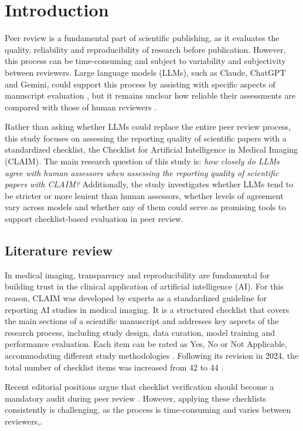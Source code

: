 \section{Introduction}
Peer review is a fundamental part of scientific publishing, as it evaluates the quality, reliability and reproducibility of research before publication. However, this process can be time-consuming and subject to variability and subjectivity between reviewers. Large language models (LLMs), such as Claude, ChatGPT and Gemini, could support this process by assisting with specific aspects of manuscript evaluation \cite{ebadi-2025}, but it remains unclear how reliable their assessments are compared with those of human reviewers \cite{suleiman-2024}. 

Rather than asking whether LLMs could replace the entire peer review process, this study focuses on assessing the reporting quality of scientific papers with a standardized checklist, the Checklist for Artificial Intelligence in Medical Imaging (CLAIM). The main research question of this study is: \textit{how closely do LLMs agree with human assessors when assessing the reporting quality of scientific papers with CLAIM?} Additionally, the study investigates whether LLMs tend to be stricter or more lenient than human assessors, whether levels of agreement vary across models and whether any of them could serve as promising tools to support checklist-based evaluation in peer review.

\subsection{Literature review}
In medical imaging, transparency and reproducibility are fundamental for building trust in the clinical application of artificial intelligence (AI). For this reason, CLAIM was developed by experts as a standardized guideline for reporting AI studies in medical imaging. It is a structured checklist that covers the main sections of a scientific manuscript and addresses key aspects of the research process, including study design, data curation, model training and performance evaluation. Each item can be rated as Yes, No or Not Applicable, accommodating different study methodologies \cite{mongan-2020}. Following its revision in 2024, the total number of checklist items was increased from 42 to 44 \cite{tejani-2024}. 

Recent editorial positions argue that checklist verification should become a mandatory audit during peer review \cite{zhong-2025}. However, applying these checklists consistently is challenging, as the process is time-consuming and varies between reviewers\cite{kocak-2024},\cite{kocak-2025}. 


